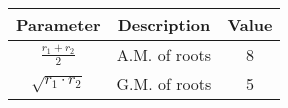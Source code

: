   \begin{tabular}{|c|c|c|}
        \hline
        \textbf{Parameter} & \textbf{Description} & \textbf{Value} \\
        \hline
        \( \frac{r_1 + r_2}{2}\)& A.M. of roots & 8 \\
        \hline
        \(\sqrt{r_1 \cdot r_2}\)& G.M. of roots & 5 \\
        \hline
    \end{tabular}

